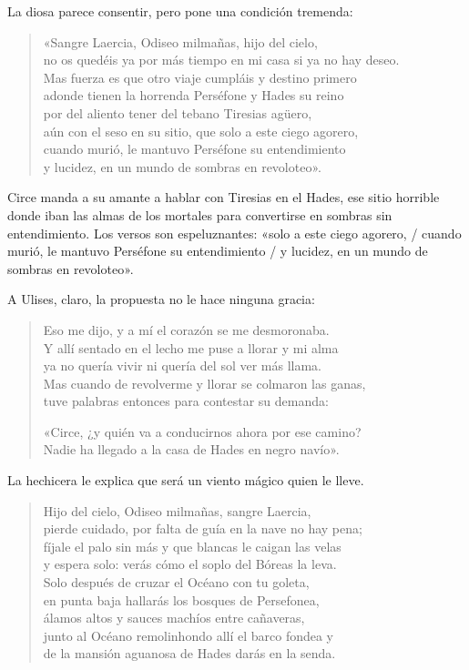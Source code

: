 \documentclass[11pt,a4paper]{article}
\begin{document}
La diosa parece consentir, pero pone una condición tremenda:

\begin{verse}
«Sangre Laercia, Odiseo milmañas, hijo del cielo,\\
no os quedéis ya por más tiempo en mi casa si ya no hay deseo.\\
Mas fuerza es que otro viaje cumpláis y destino primero\\
adonde tienen la horrenda Perséfone y Hades su reino\\
por del aliento tener del tebano Tiresias agüero,\\
aún con el seso en su sitio, que solo a este ciego agorero,\\
cuando murió, le mantuvo Perséfone su entendimiento\\
y lucidez, en un mundo de sombras en revoloteo».
\end{verse}

Circe manda a su amante a hablar con Tiresias en el Hades, ese sitio horrible donde iban las almas de los mortales para convertirse en sombras sin entendimiento. Los versos son espeluznantes: «solo a este ciego agorero, / cuando murió, le mantuvo Perséfone su entendimiento / y lucidez, en un mundo de sombras en revoloteo».

A Ulises, claro, la propuesta no le hace ninguna gracia:

\begin{verse}
Eso me dijo, y a mí el corazón se me desmoronaba.\\
Y allí sentado en el lecho me puse a llorar y mi alma\\
ya no quería vivir ni quería del sol ver más llama.\\
Mas cuando de revolverme y llorar se colmaron las ganas,\\
tuve palabras entonces para contestar su demanda:

«Circe, ¿y quién va a conducirnos ahora por ese camino?\\
Nadie ha llegado a la casa de Hades en negro navío».
\end{verse}

La hechicera le explica que será un viento mágico quien le lleve.

\begin{verse}
Hijo del cielo, Odiseo milmañas, sangre Laercia,\\
pierde cuidado, por falta de guía en la nave no hay pena;\\
fíjale el palo sin más y que blancas le caigan las velas\\
y espera solo: verás cómo el soplo del Bóreas la leva.\\
Solo después de cruzar el Océano con tu goleta,\\
en punta baja hallarás los bosques de Persefonea,\\
álamos altos y sauces machíos entre cañaveras,\\
junto al Océano remolinhondo allí el barco fondea y\\
de la mansión aguanosa de Hades darás en la senda.
\end{verse}
\end{document}
